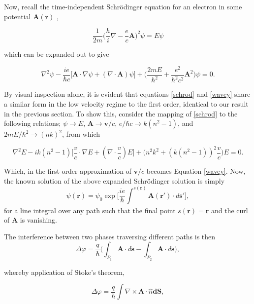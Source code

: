 Now, recall the time-independent Schr\"odinger equation for an electron in some potential $\bm{A(r)}$ \cite{Sakurai1995},

\begin{equation}
\dfrac{1}{2m} \Big(\dfrac{h}{i} \nabla - \dfrac{e}{c} \bm{A} \Big)^2 \psi = E \psi
\end{equation}

which can be expanded out to give

\begin{equation}
\label{schrod}
\nabla^2 \psi - \dfrac{ie}{\hbar c} \big[ \bm{A} \cdot \nabla \psi + (\nabla \cdot \bm{A}) \psi \big] + \big(\dfrac{2mE}{\hbar^2} + \dfrac{e^2}{\hbar^2 c^2} \bm{A}^2 \big) \psi = 0.
\end{equation}

By visual inspection alone, it is evident that equations \ref{schrod} and \ref{wavey} share a similar form in the low velocity regime to the first order, identical to our result in the previous section. To show this, consider the mapping of \ref{schrod} to the following relations; $\psi \rightarrow E$, $\bm{A} \rightarrow \bm{v}/c$, $e/\hbar c \rightarrow k(n^2-1)$, and $2mE/\hbar^2 \rightarrow (nk)^2$, from which

\begin{equation}
\nabla^2 E - ik(n^2-1) \big[ \dfrac{v}{c} \cdot \nabla E + (\nabla \cdot \dfrac{v}{c})E \big] + \big(n^2k^2 + (k(n^2-1))^2 \dfrac{v}{c} \big) E = 0.
\end{equation}

Which, in the first order approximation of $\textbf{v}/c$ becomes Equation \ref{wavey}. Now, the known solution of the above expanded Schr\"odinger solution is simply
\begin{equation}
\psi(\bm{r}) = \psi_0 \exp \Big[\dfrac{ie}{\hbar} \int_{}^{s(\bm{r})} \bm{A(r')} \cdot d\bm{s'} \Big],
\end{equation}
for a line integral over any path such that the final point $s(\bm{r}) = \bm{r}$ and the curl of $\bm{A}$ is vanishing. 

The interference between two phases traversing different paths is then
\begin{equation}
\Delta \varphi = \dfrac{q}{\hbar} \Big(\int_{P_1} \bm{A} \cdot d\bm{s} - \int_{P_2} \bm{A} \cdot d\bm{s} \Big),
\end{equation}

whereby application of Stoke's theorem,

\begin{equation}
\Delta \varphi = \dfrac{q}{\hbar} \int \nabla \times \bm{A} \cdot \hat{n}\textbf{dS},
\end{equation}

